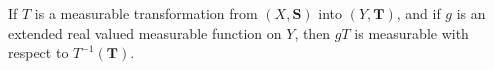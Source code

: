 If $T$ is a measurable transformation from $(X, \mathbf{S})$ into $(Y, \mathbf{T})$, and if $g$ is an extended real valued measurable function on $Y$, then $gT$ is measurable with respect to $T^{-1}(\mathbf{T})$.
